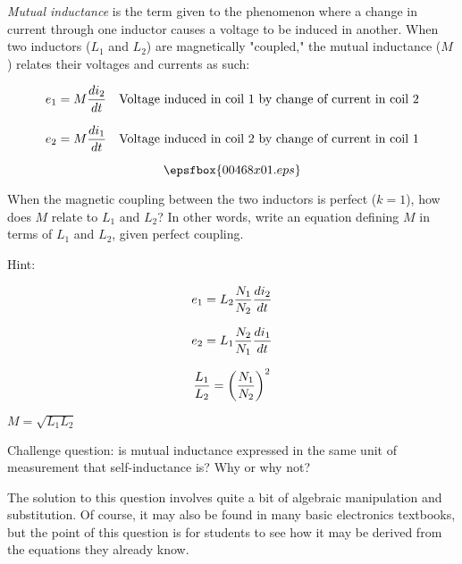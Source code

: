 

{\it Mutual inductance} is the term given to the phenomenon where a change in current through one inductor causes a voltage to be induced in another.  When two inductors ($L_1$ and $L_2$) are magnetically "coupled," the mutual inductance ($M$) relates their voltages and currents as such:

$$e_1 = M{di_2 \over dt} \hskip 10pt \hbox{Voltage induced in coil 1 by change of current in coil 2}$$

$$e_2 = M{di_1 \over dt} \hskip 10pt \hbox{Voltage induced in coil 2 by change of current in coil 1}$$

$$\epsfbox{00468x01.eps}$$

When the magnetic coupling between the two inductors is perfect ($k = 1$), how does $M$ relate to $L_1$ and $L_2$?  In other words, write an equation defining $M$ in terms of $L_1$ and $L_2$, given perfect coupling.

\vskip 10pt

Hint:

$$e_1 = L_2 {N_1 \over N_2} {di_2 \over dt}$$

$$e_2 = L_1 {N_2 \over N_1} {di_1 \over dt}$$

$${L_1 \over L_2} = \left( {N_1 \over N_2} \right)^2$$







$M = \sqrt{L_1 L_2}$

\vskip 10pt

Challenge question: is mutual inductance expressed in the same unit of measurement that self-inductance is?  Why or why not?







The solution to this question involves quite a bit of algebraic manipulation and substitution.  Of course, it may also be found in many basic electronics textbooks, but the point of this question is for students to see how it may be derived from the equations they already know.




